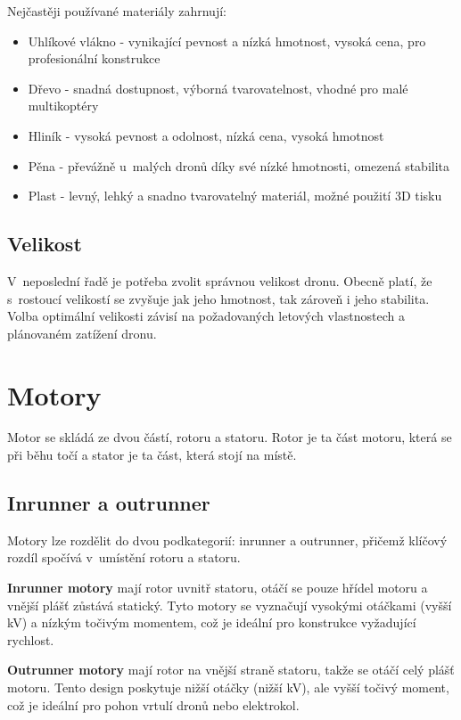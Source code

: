 \documentclass[12pt]{report}
\begin{document}
Nejčastěji používané materiály zahrnují:
\begin{itemize}
	\item Uhlíkové vlákno - vynikající pevnost a nízká hmotnost, vysoká cena, pro profesionální konstrukce
	\item Dřevo - snadná dostupnost, výborná tvarovatelnost, vhodné pro malé multikoptéry
	\item Hliník - vysoká pevnost a odolnost, nízká cena, vysoká hmotnost
	\item Pěna - převážně u~malých dronů díky své nízké hmotnosti, omezená stabilita
	\item Plast - levný, lehký a snadno tvarovatelný materiál, možné použití 3D tisku
\end{itemize}

\subsection[Velikost]{Velikost}
V~neposlední řadě je potřeba zvolit správnou velikost dronu. Obecně platí, že s~rostoucí velikostí se zvyšuje jak jeho hmotnost, tak zároveň i jeho stabilita. Volba optimální velikosti závisí na požadovaných letových vlastnostech a plánovaném zatížení dronu. \cite{mainbook} \cite{dojo} \cite{ultimateguide}

\section[Motory]{Motory}
Motor se skládá ze dvou částí, rotoru a statoru. Rotor je ta část motoru, která se při běhu točí a stator je ta část, která stojí na místě.

\subsection[Inrunner a outrunner]{Inrunner a outrunner}
Motory lze rozdělit do dvou podkategorií: inrunner a outrunner, přičemž klíčový rozdíl spočívá v~umístění rotoru a statoru.

\textbf{Inrunner motory} mají rotor uvnitř statoru, otáčí se pouze hřídel motoru a vnější plášť zůstává statický. Tyto motory se vyznačují vysokými otáčkami (vyšší kV) a nízkým točivým momentem, což je ideální pro konstrukce vyžadující rychlost.

\textbf{Outrunner motory} mají rotor na vnější straně statoru, takže se otáčí celý plášť motoru. Tento design poskytuje nižší otáčky (nižší kV), ale vyšší točivý moment, což je ideální pro pohon vrtulí dronů nebo elektrokol. 
\end{document}

